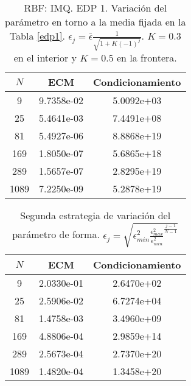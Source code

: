 \documentclass[11pt,a4paper]{article}
\begin{document}
\begin{table}
\begin{center}
\caption{RBF: IMQ. EDP 1. Variación del parámetro en torno a la media fijada en la Tabla \ref{edp1}. $\epsilon_j=\bar{\epsilon} \frac{1}{\sqrt{1+K(-1)^j}}$. $K=0.3$ en el interior y $K=0.5$ en la frontera.  }
\begin{tabular}{|c|cc|}
\hline
$N$ & ECM &Condicionamiento \\
\hline
9&9.7358e-02&5.0092e+03\\
25&5.4641e-03& 7.4491e+08 \\
81& 5.4927e-06& 8.8868e+19\\
169&1.8050e-07&5.6865e+18\\
289& 1.5657e-07&2.8295e+19\\
1089& 7.2250e-09& 5.2878e+19\\
\hline
\end{tabular}
\end{center}
\end{table}
\begin{table}
\begin{center}
\caption{Segunda estrategia de variación del parámetro de forma. $\epsilon_j=\sqrt{\epsilon_{min}^2\frac{\epsilon_{max}^2}{\epsilon_{min}^2}^{\frac{j-1}{N-1}}}$}
\begin{tabular}{|c|cc|}
\hline
$N$ & ECM & Condicionamiento\\
\hline
9&2.0330e-01 & 2.6470e+02\\
25& 2.5906e-02&6.7274e+04\\
81&1.4758e-03&3.4960e+09 \\
169 &  4.8806e-04&2.9859e+14 \\
289 & 2.5673e-04&2.7370e+20\\
1089& 1.4820e-04& 1.3458e+20\\
\hline
\end{tabular}
\end{center}
\end{table}
\end{document}

